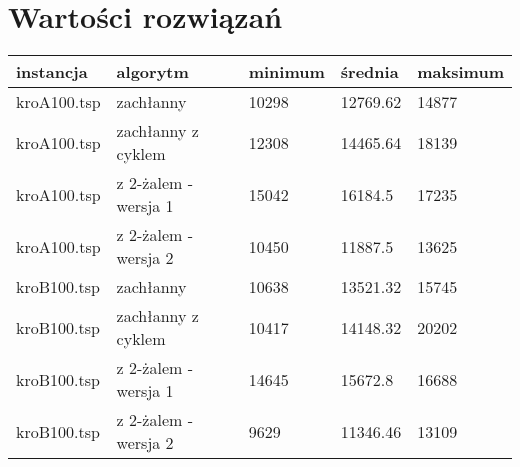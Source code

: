 \documentclass[12pt]{article}
\begin{document}
	\section{Wartości rozwiązań}
	\begin{tabular}{| l | l | l | l | l |}
		\rowcolor{gray!50}
		\hline
		instancja & algorytm & minimum & średnia & maksimum\\ \hline
		kroA100.tsp & zachłanny & 10298 & 12769.62 & 14877 \\ \hline
		kroA100.tsp & zachłanny z cyklem & 12308 & 14465.64 & 18139 \\ \hline
		kroA100.tsp & z 2-żalem - wersja 1 & 15042 & 16184.5 & 17235 \\ \hline
		kroA100.tsp & z 2-żalem - wersja 2 & 10450 & 11887.5 & 13625 \\ \hline
		kroB100.tsp & zachłanny & 10638 & 13521.32 & 15745 \\ \hline
		kroB100.tsp & zachłanny z cyklem & 10417 & 14148.32 & 20202 \\ \hline
		kroB100.tsp & z 2-żalem - wersja 1 & 14645 & 15672.8 & 16688 \\ \hline
		kroB100.tsp & z 2-żalem - wersja 2 & 9629 & 11346.46 & 13109 \\ \hline
		
	\end{tabular}
	
\end{document}
